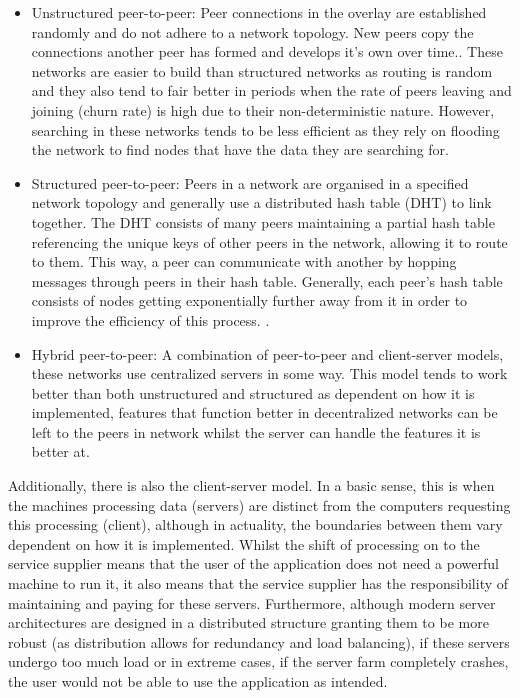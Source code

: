 \documentclass[]{report}
\begin{document}
			\begin{itemize}
				\item Unstructured peer-to-peer:
				Peer connections in the overlay are established randomly and do not adhere to a network topology. New peers copy the connections another peer has formed and develops it's own over time.\cite{P2P overlay networks}. These networks are easier to build than structured networks as routing is random and they also tend to fair better in periods when the rate of peers leaving and joining (churn rate) is high due to their non-deterministic nature. However, searching in these networks tends to be less efficient as they rely on flooding the network to find nodes that have the data they are searching for.
				\item Structured peer-to-peer:
				Peers in a network are organised in a specified network topology and generally use a distributed hash table (DHT) to link together. The DHT consists of many peers maintaining a partial hash table referencing the unique keys of other peers in the network, allowing it to route to them. This way, a peer can communicate with another by hopping messages through peers in their hash table. Generally, each peer's hash table consists of nodes getting exponentially further away from it in order to improve the efficiency of this process. \cite{P2P overlay networks}. 
				\item Hybrid peer-to-peer:
				A combination of  peer-to-peer and client-server models, these networks use centralized servers in some way.  This model tends to work better than both unstructured and structured as dependent on how it is implemented, features that function better in decentralized networks can be left to the peers in network whilst the server can handle the features it is better at. \cite{Hybrid P2P network}
			\end{itemize}
						
			Additionally, there is also the client-server model. In a basic sense, this is when the machines processing data (servers) are distinct from the computers requesting this processing (client), although in actuality, the boundaries between them vary dependent on how it is implemented. Whilst the shift of processing on to the service supplier means that the user of the application does not need a powerful machine to run it, it also means that the service supplier has the responsibility of maintaining and paying for these servers. Furthermore, although modern server architectures are designed in a distributed structure granting them to be more robust (as distribution allows for redundancy and load balancing), if these servers undergo too much load or in extreme cases, if the server farm completely crashes, the user would not be able to use the application as intended.
			
\end{document}
